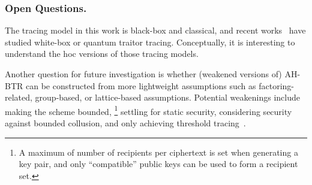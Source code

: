 \subsubsection{Open Questions.}
The tracing model in this work is black-box and classical, and recent works~\cite{C:Zhandry21,TCC:Zhandry20} have studied white-box or quantum traitor tracing.
Conceptually, it is interesting to understand the \ad hoc versions of those tracing models.

Another question for future investigation is whether
(weakened versions of) AH-BTR can be constructed from more lightweight assumptions such as factoring-related, group-based, or lattice-based assumptions.
Potential weakenings include
making the scheme bounded,%
\footnote{A maximum of number of recipients per ciphertext is set when generating a key pair, and only ``compatible'' public keys can be used to form a recipient set.}
settling for static security,
considering security against bounded collusion, and
only achieving threshold tracing~\cite{C:NaoPin98}.
